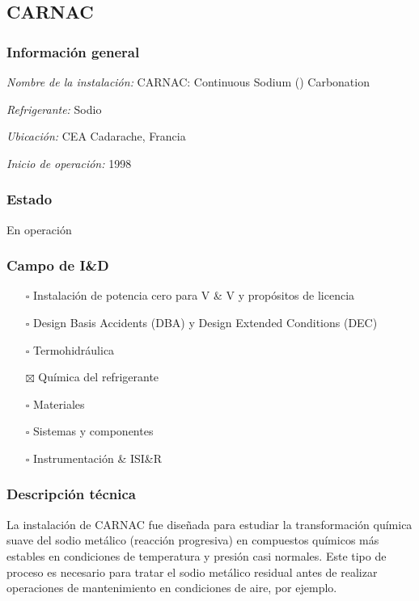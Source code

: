 \documentclass{article}
\begin{document}
\subsection{CARNAC}
\subsubsection*{Información general}
\textit{Nombre de la instalación: }CARNAC: Continuous Sodium () Carbonation

\textit{Refrigerante: }Sodio

\textit{Ubicación: }CEA Cadarache, Francia

\textit{Inicio de operación: }1998

\subsubsection*{Estado}
En operación

\subsubsection*{Campo de I\&D}
\begin{itemize}
\item[$\square$] Instalación de potencia cero para V \& V y propósitos de licencia
\item[$\square$] Design Basis Accidents (DBA) y Design Extended Conditions (DEC)
\item[$\square$] Termohidráulica
\item[$\boxtimes$] Química del refrigerante
\item[$\square$] Materiales
\item[$\square$] Sistemas y componentes
\item[$\square$] Instrumentación \& ISI\&R
\end{itemize}
\subsubsection*{Descripción técnica}
La instalación de CARNAC fue diseñada para estudiar la transformación química suave del sodio metálico (reacción progresiva) en compuestos químicos más estables en condiciones de temperatura y presión casi normales. Este tipo de proceso es necesario para tratar el sodio metálico residual antes de realizar operaciones de mantenimiento en condiciones de aire, por ejemplo.
\end{document}
